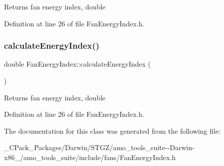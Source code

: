 \begin{DoxyReturn}{Returns}
fan energy index, double 
\end{DoxyReturn}


Definition at line 26 of file Fan\+Energy\+Index.\+h.

\mbox{\label{class_fan_energy_index_ab1bf0268caaed615a5f00027b3801198}} 
\subsubsection{\texorpdfstring{calculate\+Energy\+Index()}{calculateEnergyIndex()}\hspace{0.1cm}{\footnotesize\ttfamily [3/3]}}
{\footnotesize\ttfamily double Fan\+Energy\+Index\+::calculate\+Energy\+Index (\begin{DoxyParamCaption}{ }\end{DoxyParamCaption})\hspace{0.3cm}{\ttfamily [inline]}}

\begin{DoxyReturn}{Returns}
fan energy index, double 
\end{DoxyReturn}


Definition at line 26 of file Fan\+Energy\+Index.\+h.



The documentation for this class was generated from the following file\+:\begin{DoxyCompactItemize}
\item 
\+\_\+\+C\+Pack\+\_\+\+Packages/\+Darwin/\+S\+T\+G\+Z/amo\+\_\+tools\+\_\+suite-\/-\/\+Darwin-\/x86\+\_/amo\+\_\+tools\+\_\+suite/include/fans/Fan\+Energy\+Index.\+h\end{DoxyCompactItemize}
